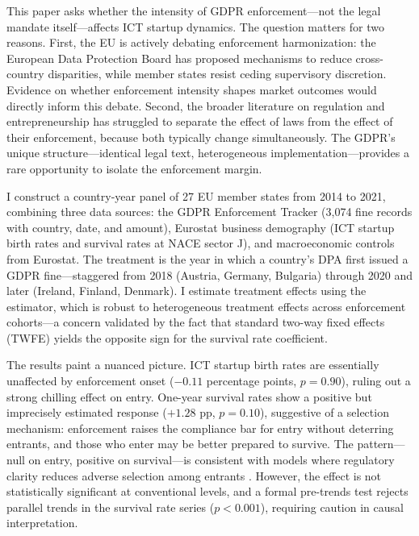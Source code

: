 \documentclass[12pt]{article}
\begin{document}
This paper asks whether the intensity of GDPR enforcement---not the legal mandate itself---affects ICT startup dynamics. The question matters for two reasons. First, the EU is actively debating enforcement harmonization: the European Data Protection Board has proposed mechanisms to reduce cross-country disparities, while member states resist ceding supervisory discretion. Evidence on whether enforcement intensity shapes market outcomes would directly inform this debate. Second, the broader literature on regulation and entrepreneurship \citep{djankov2002, bailey2022} has struggled to separate the effect of laws from the effect of their enforcement, because both typically change simultaneously. The GDPR's unique structure---identical legal text, heterogeneous implementation---provides a rare opportunity to isolate the enforcement margin.

I construct a country-year panel of 27 EU member states from 2014 to 2021, combining three data sources: the GDPR Enforcement Tracker (3,074 fine records with country, date, and amount), Eurostat business demography (ICT startup birth rates and survival rates at NACE sector J), and macroeconomic controls from Eurostat. The treatment is the year in which a country's DPA first issued a GDPR fine---staggered from 2018 (Austria, Germany, Bulgaria) through 2020 and later (Ireland, Finland, Denmark). I estimate treatment effects using the \citet{callaway2021} estimator, which is robust to heterogeneous treatment effects across enforcement cohorts---a concern validated by the fact that standard two-way fixed effects (TWFE) yields the opposite sign for the survival rate coefficient.

The results paint a nuanced picture. ICT startup birth rates are essentially unaffected by enforcement onset ($-0.11$ percentage points, $p = 0.90$), ruling out a strong chilling effect on entry. One-year survival rates show a positive but imprecisely estimated response ($+1.28$ pp, $p = 0.10$), suggestive of a selection mechanism: enforcement raises the compliance bar for entry without deterring entrants, and those who enter may be better prepared to survive. The pattern---null on entry, positive on survival---is consistent with models where regulatory clarity reduces adverse selection among entrants \citep{aghion2010}. However, the effect is not statistically significant at conventional levels, and a formal pre-trends test rejects parallel trends in the survival rate series ($p < 0.001$), requiring caution in causal interpretation.
\end{document}
